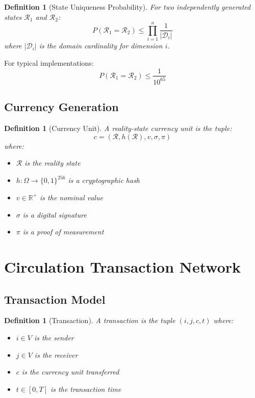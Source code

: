 \documentclass[12pt]{article}
\newtheorem{definition}[theorem]{Definition}
\begin{document}
\begin{definition}[State Uniqueness Probability]
For two independently generated states $\mathcal{R}_1$ and $\mathcal{R}_2$:
$$
P(\mathcal{R}_1 = \mathcal{R}_2) \leq \prod_{i=1}^{n} \frac{1}{|\mathcal{D}_i|}
$$
where $|\mathcal{D}_i|$ is the domain cardinality for dimension $i$.
\end{definition}

For typical implementations:
$$
P(\mathcal{R}_1 = \mathcal{R}_2) \leq \frac{1}{10^{65}}
$$

\subsection{Currency Generation}

\begin{definition}[Currency Unit]
A reality-state currency unit is the tuple:
$$
c = (\mathcal{R}, h(\mathcal{R}), v, \sigma, \pi)
$$
where:
\begin{itemize}
    \item $\mathcal{R}$ is the reality state
    \item $h: \Omega \to \{0,1\}^{256}$ is a cryptographic hash
    \item $v \in \mathbb{R}^+$ is the nominal value
    \item $\sigma$ is a digital signature
    \item $\pi$ is a proof of measurement
\end{itemize}
\end{definition}

\section{Circulation Transaction Network}

\subsection{Transaction Model}

\begin{definition}[Transaction]
A transaction is the tuple $(i,j,c,t)$ where:
\begin{itemize}
    \item $i \in V$ is the sender
    \item $j \in V$ is the receiver
    \item $c$ is the currency unit transferred
    \item $t \in [0,T]$ is the transaction time
\end{itemize}
\end{definition}
\end{document}
